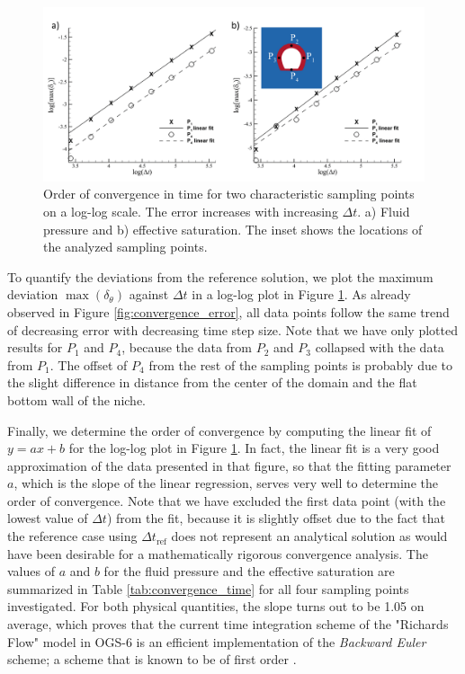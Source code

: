 \begin{figure}[t]
\includegraphics[width=\textwidth]{./figures/MEX10_convergence_time.png}
\caption{Order of convergence in time for two characteristic sampling points on a log-log scale. The error increases with increasing $\Delta t$. a) Fluid pressure and b) effective saturation. The inset shows the locations of the analyzed sampling points. }
\label{fig:convergence_time}
\end{figure}

To quantify the deviations from the reference solution, we plot the maximum deviation $\max{(\delta_\theta)}$ against $\Delta t$ in a log-log plot in Figure \ref{fig:convergence_time}. As already observed in Figure \ref{fig:convergence_error}, all data points follow the same trend of decreasing error with decreasing time step size. Note that we have only plotted results for $P_1$ and $P_4$, because the data from $P_2$ and $P_3$ collapsed with the data from $P_1$. The offset of $P_4$ from the rest of the sampling points is probably due to the slight difference in distance from the center of the domain and the flat bottom wall of the niche.


Finally, we determine the order of convergence by computing the linear fit of $y=ax + b$ for the log-log plot in Figure \ref{fig:convergence_time}. In fact, the linear fit is a very good approximation of the data presented in that figure, so that the fitting parameter $a$, which is the slope of the linear regression, serves very well to determine the order of convergence. Note that we have excluded the first data point (with the lowest value of $\Delta t$) from the fit, because it is slightly offset due to the fact that the reference case using $\Delta t_\text{ref}$ does not represent an analytical solution as would have been desirable for a mathematically rigorous convergence analysis. The values of $a$ and $b$ for the fluid pressure and the effective saturation are summarized in Table \ref{tab:convergence_time} for all four sampling points investigated.  For both physical quantities, the slope turns out to be 1.05 on average, which proves that the current time integration scheme of the "Richards Flow" model in OGS-6 is an efficient implementation of the {\em Backward Euler} scheme; a scheme that is known to be of first order \cite{ferziger2012}. 

